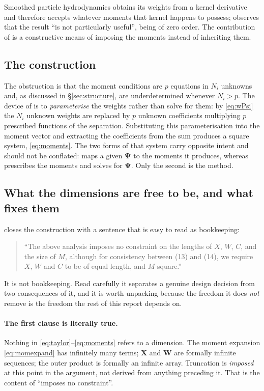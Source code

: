 \documentclass[11pt,a4paper]{article}
\begin{document}
Smoothed particle hydrodynamics obtains its weights from a kernel derivative
\cite[Eq.~(9)]{KLN2020} and therefore accepts whatever moments that kernel happens to
possess; \cite{KLN2020} observes that the result ``is not particularly useful'', being
of zero order. The contribution of \cite[\S 3.1]{KLN2020} is a constructive means of
imposing the moments instead of inheriting them.

\subsection{The construction}

The obstruction is that the moment conditions are $p$ equations in $N_i$ unknowns and,
as discussed in \S\ref{sec:structure}, are underdetermined whenever $N_i>p$. The device
of \cite[\S 3.1]{KLN2020} is to \emph{parameterise} the weights rather than solve for
them: by \eqref{eq:wPsi} the $N_i$ unknown weights are replaced by $p$ unknown
coefficients multiplying $p$ prescribed functions of the separation. Substituting this
parameterisation into the moment vector and extracting the coefficients from the sum
produces a square system, \eqref{eq:moments}. The two forms of that system carry
opposite intent and should not be conflated: \cite[Eq.~(12)]{KLN2020} maps a given
$\bm\Psi$ to the moments it produces, whereas \cite[Eq.~(14)]{KLN2020} prescribes the
moments and solves for $\bm\Psi$. Only the second is the method.

\subsection{What the dimensions are free to be, and what fixes them}
\label{app:dims}

\cite[\S 3.1]{KLN2020} closes the construction with a sentence that is easy to read as
bookkeeping:

\begin{quote}
``The above analysis imposes no constraint on the lengths of $X$, $W$, $C$, and the size
of $M$, although for consistency between (13) and (14), we require $X$, $W$ and $C$ to
be of equal length, and $M$ square.''
\end{quote}

\noindent It is not bookkeeping. Read carefully it separates a genuine design decision
from two consequences of it, and it is worth unpacking because the freedom it does
\emph{not} remove is the freedom the rest of this report depends on.

\paragraph{The first clause is literally true.} Nothing in
\eqref{eq:taylor}--\eqref{eq:moments} refers to a dimension. The moment expansion
\eqref{eq:momexpand} has infinitely many terms; $\bm X$ and $\bm W$ are formally
infinite sequences; the outer product is formally an infinite array. Truncation is
\emph{imposed} at this point in the argument, not derived from anything preceding it.
That is the content of ``imposes no constraint''.
\end{document}
